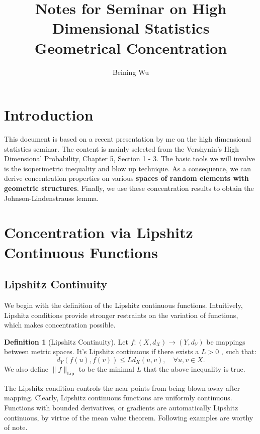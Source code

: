 \documentclass[9pt,onesided]{article}
\newcommand{\mc}{\color{BlueViolet}}
\renewcommand{\le}{\leqslant}
\theoremstyle{definition}
\newtheorem{definition}{\mc Definition}
\begin{document}
{
\title{Notes for Seminar on High Dimensional Statistics\\
\Large Geometrical Concentration}
\author{Beining Wu}
\maketitle
}

\tableofcontents

\section*{Introduction}

This document is based on a recent presentation by me on the high dimensional statistics seminar. The content is mainly selected from the Vershynin's High Dimensional Probability, Chapter 5, Section 1 - 3. The basic tools we will involve is the isoperimetric inequality and blow up technique. As a consequence, we can derive concentration properties on various \textbf{spaces of random elements with geometric structures}. Finally, we use these concentration results to obtain the Johnson-Lindenstrauss lemma.

\section{Concentration via Lipshitz Continuous Functions}

\subsection{Lipshitz Continuity}

We begin with the definition of the Lipshitz continuous functions. Intuitively, Lipshitz conditions provide stronger restraints on the variation of functions, which makes concentration possible.

\begin{definition}
[Lipshitz Continuity] Let $f:(X,d_X)\to (Y,d_Y)$ be mappings between metric spaces. It's Lipshitz continuous if there exists a $L>0$ , such that:
\begin{equation*}
    d_Y(f(u),f(v)) \le L d_X(u,v),\quad \forall u,v\in X.
\end{equation*}
We also define $\|f\|_{\mathrm{Lip}}$ to be the minimal $L$ that the above inequality is true.
\end{definition}

The Lipshitz condition controls the near points from being blown away after mapping. Clearly, Lipshitz continuous functions are uniformly continuous. Functions with bounded derivatives, or gradients are automatically Lipshitz continuous, by virtue of the mean value theorem. Following examples are worthy of note.
\end{document}

